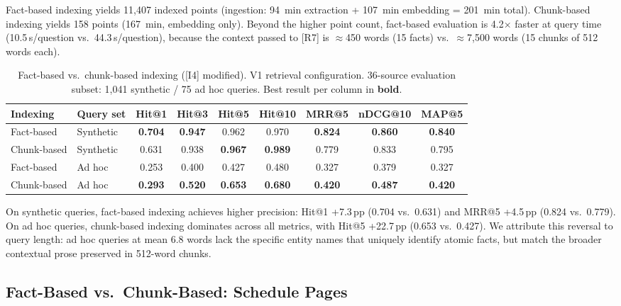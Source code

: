 \documentclass[sigconf,natbib=true]{acmart}
\begin{document}
Fact-based indexing yields 11{,}407 indexed points (ingestion: 94~min extraction + 107~min embedding = 201~min total).
Chunk-based indexing yields 158 points (167~min, embedding only).
Beyond the higher point count, fact-based evaluation is 4.2$\times$ faster at query time (10.5\,s/question vs.\ 44.3\,s/question), because the context passed to [R7] is $\approx$450 words (15 facts) vs.\ $\approx$7{,}500 words (15 chunks of 512 words each).

\begin{table}[t]
\centering
\caption{Fact-based vs.\ chunk-based indexing ([I4] modified). V1 retrieval configuration. 36-source evaluation subset: 1,041 synthetic / 75 ad hoc queries. Best result per column in \textbf{bold}.}
\label{tab:facts_vs_chunks}
\setlength{\tabcolsep}{4pt}
\small
\begin{tabular}{llccccccc}
\toprule
\textbf{Indexing} & \textbf{Query set}
  & \textbf{Hit@1} & \textbf{Hit@3} & \textbf{Hit@5} & \textbf{Hit@10}
  & \textbf{MRR@5} & \textbf{nDCG@10} & \textbf{MAP@5} \\
\midrule
Fact-based  & Synthetic & \textbf{0.704} & \textbf{0.947} & 0.962 & 0.970 & \textbf{0.824} & \textbf{0.860} & \textbf{0.840} \\
Chunk-based & Synthetic & 0.631 & 0.938 & \textbf{0.967} & \textbf{0.989} & 0.779 & 0.833 & 0.795 \\
\midrule
Fact-based  & Ad hoc    & 0.253 & 0.400 & 0.427 & 0.480 & 0.327 & 0.379 & 0.327 \\
Chunk-based & Ad hoc    & \textbf{0.293} & \textbf{0.520} & \textbf{0.653} & \textbf{0.680} & \textbf{0.420} & \textbf{0.487} & \textbf{0.420} \\
\bottomrule
\end{tabular}
\end{table}

On synthetic queries, fact-based indexing achieves higher precision: Hit@1 +7.3\,pp (0.704 vs.\ 0.631) and MRR@5 +4.5\,pp (0.824 vs.\ 0.779).
On ad hoc queries, chunk-based indexing dominates across all metrics, with Hit@5 +22.7\,pp (0.653 vs.\ 0.427).
We attribute this reversal to query length: ad hoc queries at mean 6.8 words lack the specific entity names that uniquely identify atomic facts, but match the broader contextual prose preserved in 512-word chunks.

\subsection{Fact-Based vs.\ Chunk-Based: Schedule Pages}
\label{sec:schedule_eval}
\end{document}
